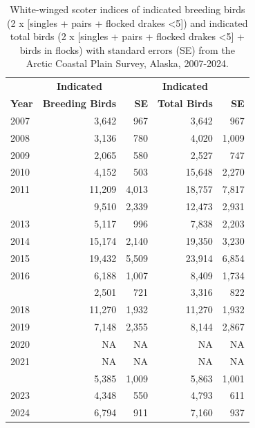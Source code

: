 \documentclass[
]{article}
\begin{document}
\begin{longtable}[t]{lrrrr}

\caption{\label{tbl-WWSC}White-winged scoter indices of indicated
breeding birds (2 x {[}singles + pairs + flocked drakes \textless5{]})
and indicated total birds (2 x {[}singles + pairs + flocked drakes
\textless5{]} + birds in flocks) with standard errors (SE) from the
Arctic Coastal Plain Survey, Alaska, 2007-2024.}

\tabularnewline

\\
\toprule
\multicolumn{1}{c}{\textbf{ }} & \multicolumn{1}{c}{\textbf{Indicated}} & \multicolumn{1}{c}{\textbf{ }} & \multicolumn{1}{c}{\textbf{Indicated}} & \multicolumn{1}{c}{\textbf{ }} \\
\cmidrule(l{3pt}r{3pt}){2-2} \cmidrule(l{3pt}r{3pt}){4-4}
\textbf{Year} & \textbf{Breeding Birds} & \textbf{SE} & \textbf{Total Birds} & \textbf{SE}\\
\midrule
2007 & 3,642 & 967 & 3,642 & 967\\
2008 & 3,136 & 780 & 4,020 & 1,009\\
2009 & 2,065 & 580 & 2,527 & 747\\
2010 & 4,152 & 503 & 15,648 & 2,270\\
2011 & 11,209 & 4,013 & 18,757 & 7,817\\
\addlinespace
2012 & 9,510 & 2,339 & 12,473 & 2,931\\
2013 & 5,117 & 996 & 7,838 & 2,203\\
2014 & 15,174 & 2,140 & 19,350 & 3,230\\
2015 & 19,432 & 5,509 & 23,914 & 6,854\\
2016 & 6,188 & 1,007 & 8,409 & 1,734\\
\addlinespace
2017 & 2,501 & 721 & 3,316 & 822\\
2018 & 11,270 & 1,932 & 11,270 & 1,932\\
2019 & 7,148 & 2,355 & 8,144 & 2,867\\
2020 & NA & NA & NA & NA\\
2021 & NA & NA & NA & NA\\
\addlinespace
2022 & 5,385 & 1,009 & 5,863 & 1,001\\
2023 & 4,348 & 550 & 4,793 & 611\\
2024 & 6,794 & 911 & 7,160 & 937\\
\bottomrule

\end{longtable}

\endgroup{}
\end{document}
